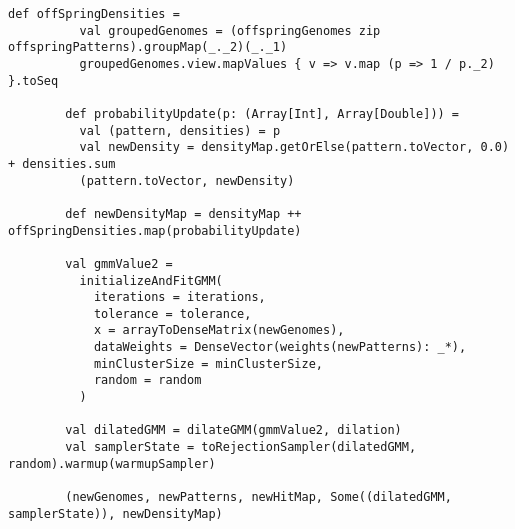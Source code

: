 \documentclass[10pt,a4paper]{article}
\theoremstyle{definition}
\theoremstyle{remark}
\begin{document}
\begin{lstlisting}[caption={Elitism function},label={lst:elitism}]
        def offSpringDensities =
          val groupedGenomes = (offspringGenomes zip offspringPatterns).groupMap(_._2)(_._1)
          groupedGenomes.view.mapValues { v => v.map (p => 1 / p._2) }.toSeq

        def probabilityUpdate(p: (Array[Int], Array[Double])) =
          val (pattern, densities) = p
          val newDensity = densityMap.getOrElse(pattern.toVector, 0.0) + densities.sum
          (pattern.toVector, newDensity)

        def newDensityMap = densityMap ++ offSpringDensities.map(probabilityUpdate)

        val gmmValue2 =
          initializeAndFitGMM(
            iterations = iterations,
            tolerance = tolerance,
            x = arrayToDenseMatrix(newGenomes),
            dataWeights = DenseVector(weights(newPatterns): _*),
            minClusterSize = minClusterSize,
            random = random
          )

        val dilatedGMM = dilateGMM(gmmValue2, dilation)
        val samplerState = toRejectionSampler(dilatedGMM, random).warmup(warmupSampler)

        (newGenomes, newPatterns, newHitMap, Some((dilatedGMM, samplerState)), newDensityMap)

    


\end{lstlisting}
\end{document}
